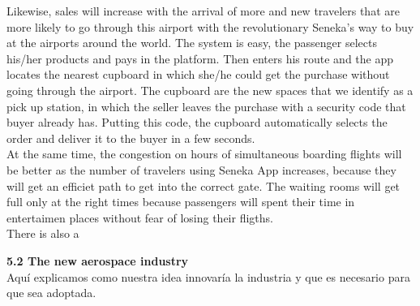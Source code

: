 \documentclass[]{article}
\begin{document}
Likewise, sales will increase with the arrival of more and new travelers that are more likely to go through this airport with the revolutionary Seneka's way to buy at the airports around the world. The system is easy, the passenger selects his/her products and pays in the platform. Then enters his route and the app locates the nearest cupboard in which she/he could get the purchase without going through the airport. The cupboard are the new spaces that we identify as a pick up station, in which the seller leaves the purchase with a security code that buyer already has. Putting this code, the cupboard automatically selects the order and deliver it to the buyer in a few seconds.\\

At the same time, the congestion on hours of simultaneous boarding flights will be better as the number of travelers using Seneka App increases, because they will get an efficiet path to get into the correct gate. The waiting rooms will get full only at the right times because passengers will spent their time in entertaimen places without fear of losing their fligths.\\

There is also a 

\Large{\textbf{5.2 The new aerospace industry}\\}
Aquí explicamos como nuestra idea innovaría la industria y que es necesario para que sea adoptada.
\end{document}
